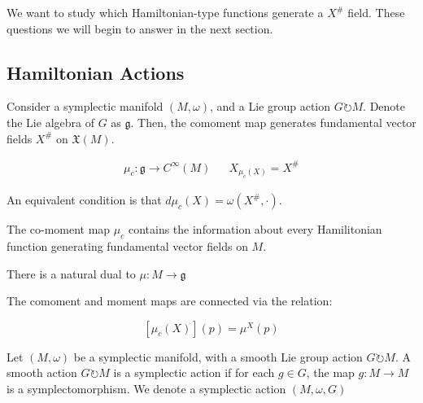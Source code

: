 \begin{remark}
We want to study which Hamiltonian-type functions generate a $X^{\#}$ field. These questions we will begin to answer in the next section. 
\end{remark}

\subsection{Hamiltonian Actions}

\begin{defn}

Consider a symplectic manifold $(M, \omega)$, and a Lie group action $G \circlearrowright M$. Denote the Lie algebra of $G$ as $\mathfrak{g}$. Then, the comoment map generates fundamental vector fields $X^{\#}$ on $\mathfrak{X}(M)$. 

\begin{align}
\mu_{c}: \mathfrak{g} \to C^{\infty}(M) && X_{\mu_{c}(X)} = X^{\#}
\end{align}

\noindent An equivalent condition is that $d \mu_{c}(X) = \omega(X^{\#}, \cdot)$.
\end{defn}

\begin{remark}
The co-moment map $\mu_{c}$ contains the information about every Hamilitonian function generating fundamental vector fields on $M$. 
\end{remark}

\begin{defn}
There is a natural dual to $\mu: M \to \mathfrak{g}$
\end{defn}

\begin{lemma}
\noindent The comoment and moment maps are connected via the relation:

$$\left[\mu_{c}(X) \right](p) = \mu^{X}(p)$$
\end{lemma}

\begin{defn}
Let $(M, \omega)$ be a symplectic manifold, with a smooth Lie group action $G \circlearrowright M$. A smooth action $G \circlearrowright M$ is a symplectic action if for each $g \in G$, the map $g: M \to M$ is a symplectomorphism. We denote a symplectic action $(M, \omega, G)$
\end{defn}

